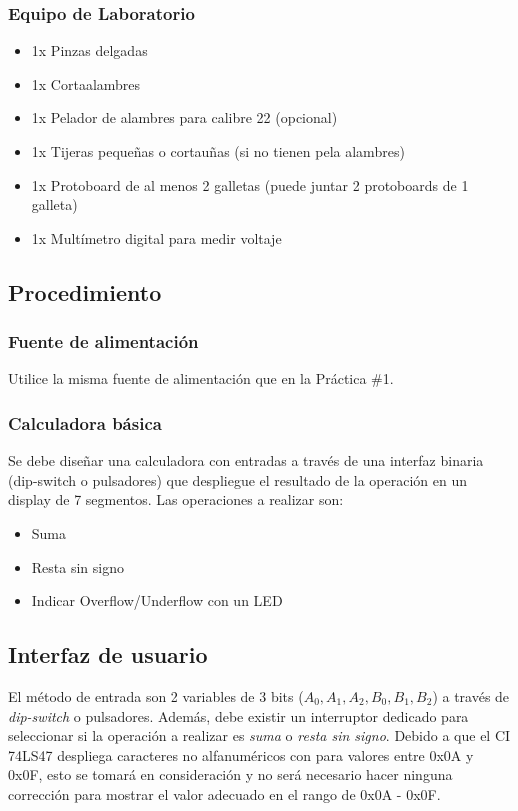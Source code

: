 \subsubsection*{Equipo de Laboratorio}
\begin{itemize}
    \item 1x Pinzas delgadas
    \item 1x Cortaalambres
    \item 1x Pelador de alambres para calibre 22 (opcional)
    \item 1x Tijeras pequeñas o cortauñas (si no tienen pela alambres)
    \item 1x Protoboard de al menos 2 galletas (puede juntar 2 protoboards de 1 galleta)
    \item 1x Multímetro digital para medir voltaje
\end{itemize}

\subsection{Procedimiento}
\subsubsection{Fuente de alimentación}
Utilice la misma fuente de alimentación que en la Práctica \#1.

\subsubsection{Calculadora básica}
Se debe diseñar una calculadora con entradas a través de una interfaz binaria (dip-switch o pulsadores) que despliegue el resultado de la
operación en un display de 7 segmentos. Las operaciones a realizar son:
\begin{itemize}
    \item Suma 
    \item Resta sin signo
    \item Indicar Overflow/Underflow con un LED
\end{itemize}

\vspace{14pt}


\subsection{Interfaz de usuario}
El método de entrada son 2 variables de 3 bits ($A_0, A_1, A_2, B_0, B_1, B_2$) a través de \emph{dip-switch} o pulsadores. Además, debe existir
un interruptor dedicado para seleccionar si la operación a realizar es \emph{suma} o \emph{resta sin signo}.
Debido a que el CI 74LS47 despliega caracteres no alfanuméricos con para valores entre 0x0A y 0x0F, esto se tomará en consideración y 
no será necesario hacer ninguna corrección para mostrar el valor adecuado en el rango de 0x0A - 0x0F.

